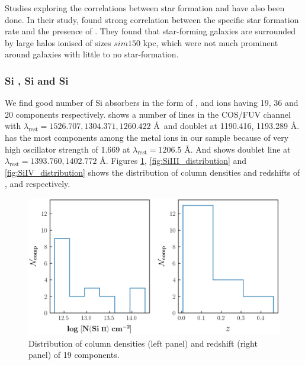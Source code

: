 Studies exploring the correlations between star formation and  have also been done. In their study, \citet{Tumlinson-2011,Tumlinson-2013} found strong correlation between the speciﬁc star formation rate and the presence of . They found that star-forming galaxies are surrounded by large halos ionised  of sizes $sim 150$ kpc, which were not much prominent around galaxies with little to no star-formation.


\subsubsection*{Si \hspace*{-0.5mm}{\footnotesize II}, Si \hspace*{-0.5mm}{\footnotesize III} and Si \hspace*{-0.5mm}{\footnotesize IV}}

We find good number of Si absorbers in the form of ,  and  ions having 19, 36 and 20 components respectively.  shows a number of lines in the COS/FUV channel with $\lambda_\text{rest}=1526.707, 1304.371, 1260.422$ \AA \  and doublet at 1190.416, 1193.289 \AA.  has the most components among the metal ions in our sample because of very high oscillator strength of 1.669 at $\lambda_\text{rest}=1206.5$ \AA. And  shows doublet line at $\lambda_\text{rest}=1393.760,1402.772$ \AA. Figures \ref{fig:SiII_distribution}, \ref{fig:SiIII_distribution} and \ref{fig:SiIV_distribution} shows the distribution of column densities and redshifts of ,  and  respectively.


\begin{figure}
    \centering
    \includegraphics[width=\linewidth]{Figures/SiII_distribution_survey.png}
    \caption{Distribution of column densities (left panel) and redshift (right panel) of 19  components.}
    \label{fig:SiII_distribution}
\end{figure}

